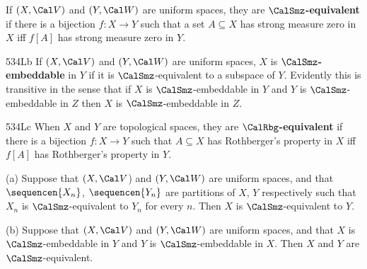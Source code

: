 
 If $(X,\Cal V)$ and
$(Y,\Cal W)$ are uniform spaces,  they are
{\bf $\CalSmz$-equivalent} if there is a bijection $f:X\to Y$ such
that
a set $A\subseteq X$ has strong measure zero in $X$ iff $f[A]$ has
strong measure zero in $Y$.   

\spheader 534Lb If $(X,\Cal V)$ and $(Y,\Cal W)$ are uniform
spaces, $X$ is {\bf $\CalSmz$-embeddable} in $Y$ if it is
$\CalSmz$-equivalent to a subspace of $Y$.   Evidently this is transitive in the sense
that if $X$ is $\CalSmz$-embeddable in $Y$ and $Y$ is
$\CalSmz$-embeddable in $Z$ then $X$ is $\CalSmz$-embeddable in $Z$.

\spheader 534Lc When $X$ and $Y$ are topological spaces, they are {\bf $\CalRbg$-equivalent} if there is a
bijection $f:X\to Y$ such that
$A\subseteq X$ has Rothberger's property in $X$ iff $f[A]$ has
Rothberger's property in $Y$.

 (a) Suppose that $(X,\Cal V$) and $(Y,\Cal W)$
are uniform spaces, and that $\sequencen{X_n}$, $\sequencen{Y_n}$ are
partitions of $X$, $Y$ respectively such that $X_n$ is
$\CalSmz$-equivalent to $Y_n$ for every $n$.   Then $X$ is
$\CalSmz$-equivalent to $Y$.

(b) Suppose that $(X,\Cal V)$ and $(Y,\Cal W)$ are uniform spaces, and
that $X$ is $\CalSmz$-embeddable in $Y$ and $Y$ is
$\CalSmz$-embeddable
in $X$.   Then $X$ and $Y$ are $\CalSmz$-equivalent.

